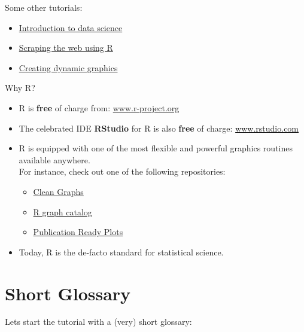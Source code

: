 \documentclass[
  14pt,
]{memoir}
\providecommand{\tightlist}{%
  \setlength{\itemsep}{0pt}\setlength{\parskip}{0pt}}
\begin{document}
Some other tutorials:

\begin{itemize}
\tightlist
\item
  \href{https://idc9.github.io/stor390/}{Introduction to data science}
\item
  \href{https://stat4701.github.io/edav/2015/04/02/rvest_tutorial/}{Scraping the web using R}
\item
  \href{https://gganimate.com/}{Creating dynamic graphics}
\end{itemize}

Why R?

\begin{itemize}
\tightlist
\item
  R is \textbf{free} of charge from: \href{https://www.r-project.org/}{www.r-project.org}
\item
  The celebrated IDE \textbf{RStudio} for R is also \textbf{free} of charge: \href{http://www.rstudio.com/}{www.rstudio.com}
\item
  R is equipped with one of the most flexible and powerful graphics routines available anywhere.\\
  For instance, check out one of the following repositories:

  \begin{itemize}
  \tightlist
  \item
    \href{http://shinyapps.org/apps/RGraphCompendium/index.php}{Clean Graphs}
  \item
    \href{http://shiny.stat.ubc.ca/r-graph-catalog/}{R graph catalog}
  \item
    \href{http://www.sthda.com/english/rpkgs/ggpubr/}{Publication Ready Plots}
  \end{itemize}
\item
  Today, R is the de-facto standard for statistical science.
\end{itemize}

\hypertarget{short-glossary}{%
\section{Short Glossary}\label{short-glossary}}

Lets start the tutorial with a (very) short glossary:
\end{document}
